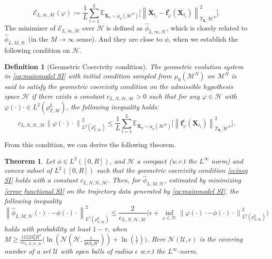 \documentclass[11pt]{article}
\newtheorem{theorem}{Theorem}[section]
\newtheorem{definition}{Definition}[section]
\newcommand{\mbf}[1]{\boldsymbol{#1}}
\newcommand{\norm}[1]{\left\| #1 \right\|}
\newcommand{\bX}{\mbf{X}}
\newcommand{\mE}{\mathcal{E}}
\newcommand{\mH}{\mathcal{H}}
\newcommand{\mM}{\mathcal{M}}
\newcommand{\mN}{\mathcal{N}}
\newcommand{\mU}{\mathcal{U}}
\newcommand{\intkernel}{\phi}
\newcommand{\lintkernel}{\widehat{\intkernel}}
\newcommand{\intkernelvar}{\varphi}
\newcommand{\E}{\mathbb{E}}
\newcommand{\probIC}{\mu_0}
\newcommand{\muX}{\probIC(\mM^N)}
\newcommand{\bXtl}{\bX_{t_l}}
\newcommand{\dotbXtl}{\dot{\bX}_{t_l}}
\begin{document}
\begin{equation}\label{error functional expected SI}
  \mE_{L, \infty, \mM}(\intkernelvar) := \frac{1}{L}\sum_{l = 1}^{L}\E_{\bX_0 \sim \muX}\Big[\norm{\dotbXtl - \mbf{f}^{\text{c}}_{\intkernelvar}(\bXtl)}_{T_{\bXtl}\mM^N}^2\Big].
\end{equation}
The minimizer of $\mE_{L, \infty, \mM}$ over $\mH$ is defined as $\lintkernel_{L, \infty, \mH}$, which is closely related to $\lintkernel_{L, M, \mH}$ (in the $M \rightarrow \infty$ sense).  And they are close to $\intkernel$, when we establish the following condition on $\mH$.
\begin{definition}[Geometric Coercivity condition]\label{CoercivityCondition SI}
The geometric evolution system in \eqref{eq:mainmodel SI} with initial condition sampled from $\muX$ on $\mM^N$ is said to satisfy the geometric coercivity condition on the admissible hypothesis space $\mH$ if there exists a constant $c_{L, N, \mH, \mM} > 0$ such that for any $\intkernelvar \in \mH$ with $\intkernelvar(\cdot)\cdot \in L^2(\rho_{T, \mM}^L)$, the following inequality holds:
\begin{equation}\label{ccineq SI}
  c_{L, N, \mH, \mM}\norm{\intkernelvar(\cdot)\cdot}_{L^2(\rho_{T,\mM}^L)}^2 \leq \frac{1}{L}\sum_{l = 1}^{L}\E_{\bX_0 \sim \muX}\Big[\norm{\mbf{f}^{\text{c}}_{\intkernelvar}(\bXtl)}_{T_{\bXtl}\mM^N}^2\Big].
\end{equation}
\end{definition}
From this condition, we can derive the following theorem. \begin{theorem}\label{control bias SI}
Let $\intkernel \in L^2([0,R])$, and $\mH$ a compact (w.r.t the $L^{\infty}$ norm) and convex subset of $ L^2([0,R])$ such that the geometric coercivity condition \eqref{ccineq SI} holds with a constant $c_{L, N,\mH, \mM}$. Then, for $\lintkernel_{L, M, \mH}$, estimated by minimizing \eqref{error functional SI} on the trajectory data generated by \eqref{eq:mainmodel SI}, the following inequality
\begin{equation}\label{estimate of norm difference}
\norm{\lintkernel_{L, M, \mH}(\cdot)\cdot - \intkernel(\cdot)\cdot}_{L^2(\rho_{T, \mM}^L)}^2 \le \frac{2}{c_{L, N,\mH, \mM}}\Big(\epsilon + \inf\limits_{\intkernelvar \in \mH}\norm{\intkernelvar(\cdot)\cdot - \intkernel(\cdot)\cdot}_{L^2(\rho_{T, \mM}^L)}^2\Big)
\end{equation}
holds with probability at least $1 - \tau$, when $M \geq \frac{1152S_0^2R^2}{\epsilon c_{L, N, \mH, \mM}}\Big(\ln(\mN(\mH, \frac{\epsilon}{48S_0R^2})) + \ln(\frac{1}{\tau})\Big)$. Here $\mN(\mU, \epsilon)$ is the covering number of a set $\mU$ with open balls of radius $\epsilon$ w.r.t the $L^{\infty}$-norm.
\end{theorem}
\end{document}

